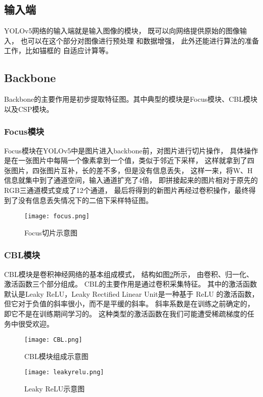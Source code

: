 \subsection{输入端}
YOLOv5网络的输入端就是输入图像的模块，
既可以向网络提供原始的图像输入，
也可以在这个部分对图像进行预处理
和数据增强，
此外还能进行算法的准备工作，比如锚框的
自适应计算等。

\subsection{Backbone}
Backbone的主要作用是初步提取特征图。其中典型的模块是Focus模块、CBL模块以及CSP模块。

\subsubsection{Focus模块}
Focus模块在YOLOv5中是图片进入backbone前，对图片进行切片操作，
具体操作是在一张图片中每隔一个像素拿到一个值，类似于邻近下采样，
这样就拿到了四张图片，四张图片互补，长的差不多，但是没有信息丢失，
这样一来，将W、H信息就集中到了通道空间，输入通道扩充了4倍，
即拼接起来的图片相对于原先的RGB三通道模式变成了12个通道，
最后将得到的新图片再经过卷积操作，最终得到了没有信息丢失情况下的二倍下采样特征图。

\begin{figure}[h]
  \centering
  \texttt{[image: focus.png]}
  \caption{Focus切片示意图}
  \label{focus}
\end{figure}

\subsubsection{CBL模块}
CBL模块是卷积神经网络的基本组成模式，
结构如图\ref{cbl}所示，
由卷积、归一化、激活函数三个部分组成。
CBL的主要作用是通过卷积采集特征。
其中的激活函数默认是Leaky ReLU，Leaky Rectified Linear Unit是一种基于 ReLU 的激活函数，但它对于负值的斜率很小，而不是平缓的斜率。 斜率系数是在训练之前确定的，即它不是在训练期间学习的。 这种类型的激活函数在我们可能遭受稀疏梯度的任务中很受欢迎。

\begin{figure}[h]
  \centering
  \texttt{[image: CBL.png]}
  \caption{CBL模块组成示意图}
  \label{cbl}
\end{figure}

\begin{figure}[h]
  \centering
  \texttt{[image: leakyrelu.png]}
  \caption{Leaky ReLU示意图}
  \label{relu}
\end{figure}


